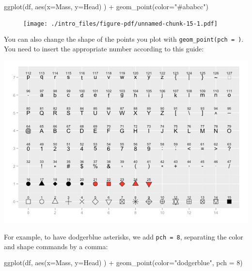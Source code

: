 \documentclass[
  letterpaper,
  DIV=11,
  numbers=noendperiod]{scrreprt}
\newenvironment{Shaded}{\begin{snugshade}}{\end{snugshade}}
\newcommand{\AttributeTok}[1]{\textcolor[rgb]{0.40,0.45,0.13}{#1}}
\newcommand{\DecValTok}[1]{\textcolor[rgb]{0.68,0.00,0.00}{#1}}
\newcommand{\FunctionTok}[1]{\textcolor[rgb]{0.28,0.35,0.67}{#1}}
\newcommand{\NormalTok}[1]{\textcolor[rgb]{0.00,0.23,0.31}{#1}}
\newcommand{\SpecialCharTok}[1]{\textcolor[rgb]{0.37,0.37,0.37}{#1}}
\newcommand{\StringTok}[1]{\textcolor[rgb]{0.13,0.47,0.30}{#1}}
\begin{document}
\begin{Shaded}
\begin{Highlighting}[]
\FunctionTok{ggplot}\NormalTok{(df, }\FunctionTok{aes}\NormalTok{(}\AttributeTok{x=}\NormalTok{Mass, }\AttributeTok{y=}\NormalTok{Head) ) }\SpecialCharTok{+} \FunctionTok{geom\_point}\NormalTok{(}\AttributeTok{color=}\StringTok{"\#ababcc"}\NormalTok{)}
\end{Highlighting}
\end{Shaded}

\begin{figure}[H]

{\centering \texttt{[image: ./intro\_files/figure-pdf/unnamed-chunk-15-1.pdf]}

}

\end{figure}

You can also change the shape of the points you plot with
\texttt{geom\_point(pch\ =\ )}. You need to insert the appropriate
number according to this guide:

\includegraphics[width=6.25in,height=\textheight]{./img/points.png}

For example, to have dodgerblue asterisks, we add \texttt{pch\ =\ 8},
separating the color and shape commands by a comma:

\begin{Shaded}
\begin{Highlighting}[]
\FunctionTok{ggplot}\NormalTok{(df, }\FunctionTok{aes}\NormalTok{(}\AttributeTok{x=}\NormalTok{Mass, }\AttributeTok{y=}\NormalTok{Head) ) }\SpecialCharTok{+} \FunctionTok{geom\_point}\NormalTok{(}\AttributeTok{color=}\StringTok{"dodgerblue"}\NormalTok{, }\AttributeTok{pch =} \DecValTok{8}\NormalTok{)}
\end{Highlighting}
\end{Shaded}
\end{document}
